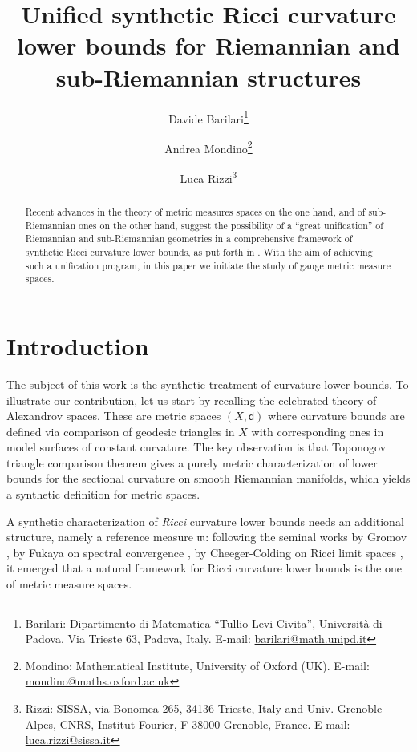 \documentclass[11pt,a4paper]{article}
\title{Unified synthetic Ricci curvature lower bounds for Riemannian and sub-Riemannian structures}
\author{
Davide Barilari\thanks{Barilari: Dipartimento di Matematica ``Tullio Levi-Civita'', Universit\`a di
Padova, Via Trieste 63, Padova, Italy. E-mail: \href{mailto:barilari@math.unipd.it}{barilari@math.unipd.it}} 
\and
Andrea Mondino\thanks{Mondino: Mathematical Institute, University of Oxford (UK). E-mail:  \href{mailto:andrea.mondino@maths.oxford.ac.uk}{mondino@maths.oxford.ac.uk}}
\and
Luca Rizzi\thanks{Rizzi: SISSA, via Bonomea 265, 34136 Trieste, Italy and Univ. Grenoble Alpes, CNRS, Institut Fourier, F-38000 Grenoble, France. 
E-mail: \href{mailto:luca.rizzi@sissa.it}{luca.rizzi@sissa.it}}
}
\theoremstyle{plain}
\theoremstyle{definition}
\theoremstyle{remark}
\numberwithin{equation}{section}
\newcommand{\mm}{\mathfrak m}
\newcommand{\sfd}{\mathsf d}
\begin{document}
\maketitle

\begin{abstract}
Recent advances in the theory of metric measures spaces on the one hand, and of sub-Riemannian ones on the other hand, suggest the possibility of a ``great unification'' of Riemannian  and sub-Riemannian geometries in a comprehensive framework of synthetic Ricci curvature lower bounds, as put forth in \cite[Sec.\@ 9]{CVNB}. With the aim of achieving such a unification program, in this paper we initiate the study of gauge metric measure spaces.
\end{abstract}

\tableofcontents

\section{Introduction}

The subject of this work is the synthetic treatment of curvature lower bounds. To illustrate our contribution, let us start by recalling the celebrated theory of Alexandrov spaces. These are metric spaces $(X,\sfd)$ where curvature bounds are defined via comparison of geodesic triangles in $X$  with corresponding ones in model surfaces of constant curvature. The key observation is that Toponogov triangle comparison theorem gives a purely metric characterization of lower bounds for the sectional curvature on smooth Riemannian manifolds, which yields a synthetic definition for metric spaces. 

A synthetic characterization of \emph{Ricci} curvature lower bounds needs an additional structure, namely  a  reference measure $\mm$: following the seminal works by Gromov   \cite{Gr}, by Fukaya on spectral convergence \cite{Fukaya}, by Cheeger-Colding  on Ricci limit spaces \cite{CheegerColdingJDG1}, it emerged that a natural framework for Ricci curvature lower bounds  is  the one of metric measure spaces.
\end{document}
